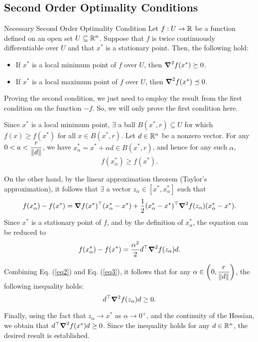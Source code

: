 \subsection{Second Order Optimality Conditions}
\begin{thm}{Necessary Second Order Optimality Condition}
	Let $f:U\to{\mathbb{R}}$ be a function defined on an open set $U\subseteq{\mathbb{R}}^n$. Suppose that $f$ is twice continuously differentiable over $U$ and that $x^*$ is a stationary point. Then, the following hold: 
	\begin{itemize}
		\item If $x^*$ is a local minimum point of $f$ over $U$, then $\grad^2f(x^*)\succeq0$.
		\item If $x^*$ is a local maximum point of $f$ over $U$, then $\grad^2f(x^*)\preceq0$.
	\end{itemize}
\end{thm}
\begin{prf}
	Proving the second condition, we just need to employ the result from the first condition on the function $-f$. So, we will only prove the first condition here. \par Since $x^*$ is a local minimum point, $\exists$ a ball $B(x^*,r)\subseteq U$ for which $f(x)\geq f(x^*)$ for all $x\in B(x^*,r)$. Let $d\in{\mathbb{R}}^n$ be a nonzero vector. For any $0<a<\dfrac{r}{\norm{d}}$, we have $x_\alpha^*=x^*+\alpha d\in B(x^*,r)$, and hence for any such $\alpha$, \begin{equation}\label{eq2}f(x_\alpha^*)\geq f(x^*).\end{equation}\par On the other hand, by the linear approximation theorem (Taylor's approximation), it follows that $\exists$ a vector $z_\alpha\in[x^*, x^*_\alpha]$ such that \[f(x_\alpha^*)-f(x^*)=\grad f(x^*)^\top(x_\alpha^*-x^*)+\dfrac{1}{2}(x_\alpha^*-x^*)^\top\grad^2f(z_\alpha)(x_\alpha^*-x^*).\] Since $x^*$ is a stationary point of $f$, and by the definition of $x^*_\alpha$, the equation can be reduced to \begin{equation}\label{eq3}f(x_\alpha^*)-f(x^*)=\dfrac{\alpha^2}{2}d^\top\grad^2f(z_\alpha)d.\end{equation}\par Combining Eq. (\ref{eq2}) and Eq. (\ref{eq3}), it follows that for any $\alpha\in\qty(0,\dfrac{r}{\norm{d}})$, the following inequality holds: \[d^\top\grad^2f(z_\alpha)d\geq0.\]\par Finally, using the fact that $z_\alpha\to x^*$ as $\alpha\to0^+$, and the continuity of the Hessian, we obtain that $d^\top\grad^2f(x^*)d\geq0$. Since the inequality holds for any $d\in{\mathbb{R}}^n$, the desired result is established. 
\end{prf}

